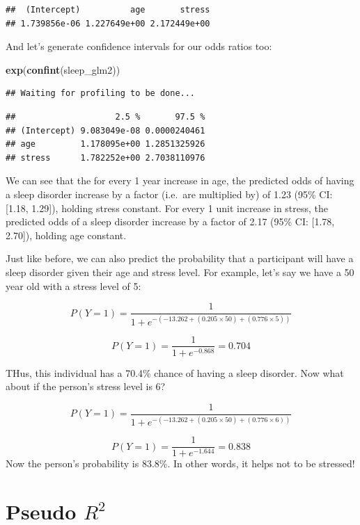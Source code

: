 \documentclass[
]{book}
\newenvironment{Shaded}{\begin{snugshade}}{\end{snugshade}}
\newcommand{\FunctionTok}[1]{\textcolor[rgb]{0.13,0.29,0.53}{\textbf{#1}}}
\newcommand{\NormalTok}[1]{#1}
\begin{document}
\begin{verbatim}
##  (Intercept)          age       stress 
## 1.739856e-06 1.227649e+00 2.172449e+00
\end{verbatim}

And let's generate confidence intervals for our odds ratios too:

\begin{Shaded}
\begin{Highlighting}[]
\FunctionTok{exp}\NormalTok{(}\FunctionTok{confint}\NormalTok{(sleep\_glm2))}
\end{Highlighting}
\end{Shaded}

\begin{verbatim}
## Waiting for profiling to be done...
\end{verbatim}

\begin{verbatim}
##                    2.5 %       97.5 %
## (Intercept) 9.083049e-08 0.0000240461
## age         1.178095e+00 1.2851325926
## stress      1.782252e+00 2.7038110976
\end{verbatim}

We can see that the for every 1 year increase in age, the predicted odds of having a sleep disorder increase by a factor (i.e.~are multiplied by) of 1.23 (95\% CI: {[}1.18, 1.29{]}), holding stress constant. For every 1 unit increase in stress, the predicted odds of a sleep disorder increase by a factor of 2.17 (95\% CI: {[}1.78, 2.70{]}), holding age constant.

Just like before, we can also predict the probability that a participant will have a sleep disorder given their age and stress level. For example, let's say we have a 50 year old with a stress level of 5:

\[
P(Y = 1) = \frac{1}{1 + e^{-(-13.262 + (0.205 \times 50) + (0.776 \times 5))}} 
\]

\[
P(Y = 1) = \frac{1}{1 + e^{-0.868}} = 0.704
\]

THus, this individual has a 70.4\% chance of having a sleep disorder. Now what about if the person's stress level is 6?

\[
P(Y = 1) = \frac{1}{1 + e^{-(-13.262 + (0.205 \times 50) + (0.776 \times 6))}} 
\]

\[
P(Y = 1) = \frac{1}{1 + e^{-1.644}} = 0.838
\]
Now the person's probability is 83.8\%. In other words, it helps not to be stressed!

\section{\texorpdfstring{Pseudo \(R^2\)}{Pseudo R\^{}2}}\label{pseudo-r2}
\end{document}
